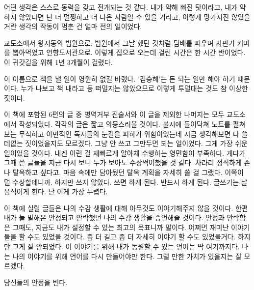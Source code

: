 \documentclass[12pt, b6paper, openany]{memoir}
\newenvironment{article}{}{}
\begin{document}
\begin{article}
어떤 생각은 스스로 동력을 갖고 전개되는 것 같다. 내가 약해 빠진 탓이라고, 내가 약하지 않았다면 난 더 멀쩡하고 더 나은 사람일 수 있을 거라고, 이렇게 망가지진 않았을 거란 생각의 작동이 멈춘 건 얼마 전의 일이었다.

교도소에서 왕지동의 법원으로, 법원에서 그날 했던 것처럼 담배를 피우며 자판기 커피를 뽑아먹었고 연향도서관으로. 이렇게 집으로 오는데 걸린 시간은 한 시간 반이었다. 이 귀갓길을 위해 1년 3개월이 걸렸다.

이 이름으로 책을 낼 일이 영원히 없길 바랬다. '김승해'는 돈 되는 일만 해야 하기 때문이다. 누가 나보고 책 내라고 등 떠밀지는 않았으므로 이렇게 투덜대는 것도 참 이상한 짓이다.

이 책에 포함된 6편의 글 중 병역거부 진술서와 이 글을 제외한 나머지는 모두 교도소에서 작성되었다. 각각의 글은 짧고 의뭉스러울 것이다. 불시에 들이닥쳐 노트를 펼쳐보는 무식하고 야만적인 독자들의 눈길을 피하기 위함이었는데 지금 생각해보면 다 쓸데없는 짓이었을지도 모르겠다. 그냥 안 쓰고 그만두면 되는 일이었다. 그게 가장 쉬운 일이었을 것이다. 내겐 이런 걸 재빠르게 알아채 수행하는 영민함이 부족하다. 게다가 그때 쓴 글들을 지금 다시 보니 누가 보아도 수상쩍어했을 것 같다. 차라리 정직하게 존나 탈옥하고 싶다고, 마음 속에만 담아뒀던 탈옥 계획을 자세히 쓸 걸 그랬다. 이쪽이 덜 수상할테니까. 하지만 쓰지 않았다. 쓰면 하게 된다. 반드시 하게 된다. 글쓰기는 날 움직이게 한다. 난 이게 가장 두렵다.

이 책에 실릴 글들은 나의 수감 생활에 대해 아무것도 이야기해주지 않을 것이다. 한편 내가 늘 말해온 안정되고 안락했던 나의 수감 생활을 증언해줄 것이다. 안정과 안락함은 그때도, 지금도 내가 설정할 수 있는 최고의 목표니까 말이다. 어쩌면 재미난 이야기들을 할 수도 있었을 것이다. 좀 더 길고 좀 더 자세히 이야기 할 수도 있었을거다. 하지만 그게 잘 안되었다. 이 이야기를 위해 내가 동원할 수 있는 언어는 딱 여기까지다. 나는 나의 이야기를 위해 언어를 다시 만들어야만 한다. 그럴 만한 가치가 있을지는 잘 모르겠다.

당신들의 안정을 빈다.
\end{article}

\backmatter
\end{document}
